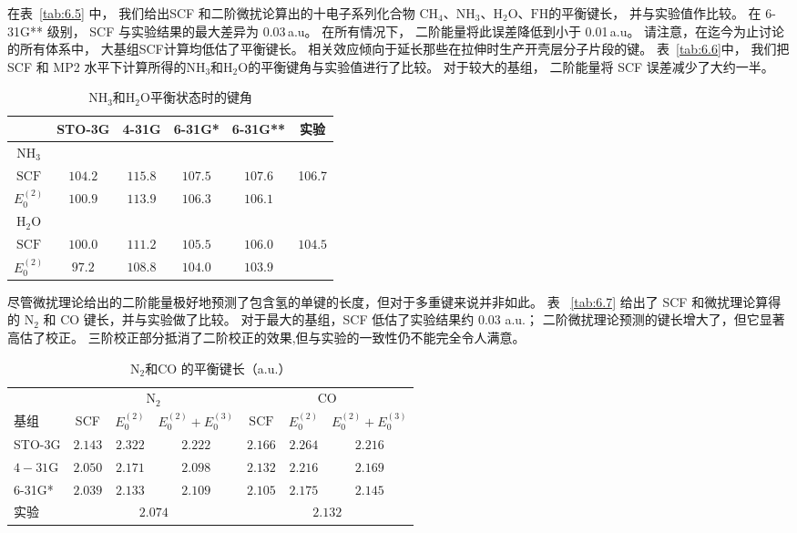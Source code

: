 在表~\autoref{tab:6.5} 中，
我们给出SCF 和二阶微扰论算出的十电子系列化合物
$\mathrm{CH}_4$、$\mathrm{NH}_3$、$\mathrm{H_2O}$、$\mathrm{FH}$的平衡键长，
并与实验值作比较。
在 6-31G** 级别，
SCF 与实验结果的最大差异为 0.03\,a.u。
在所有情况下，
二阶能量将此误差降低到小于 0.01\,a.u。
请注意，在迄今为止讨论的所有体系中，
大基组SCF计算均低估了平衡键长。
相关效应倾向于延长那些在拉伸时生产开壳层分子片段的键。 
表~\autoref{tab:6.6}中，
我们把SCF 和 MP2 水平下计算所得的$\mathrm{NH}_3$和$\mathrm{H_2O}$的平衡键角与实验值进行了比较。 
对于较大的基组，
二阶能量将 SCF 误差减少了大约一半。
\begin{table}
	\centering
	\caption{$\mathrm{NH_3}$和$\mathrm{H_2O}$平衡状态时的键角}
	\begin{threeparttable}
	\begin{tabular}{cccccc}
		\hline & STO-3G & 4-31G & 6-31G* & 6-31G** & 实验 \\
		\hline $\mathrm{NH}_3$ & & & & & \\
		$\mathrm{SCF}$ & $104.2$ & $115.8$ & $107.5$ & $107.6$ & \multirow{2}{*}{106.7} \\
		$E_0^{(2)}$ & $100.9$ & $113.9$ & $106.3$ & $106.1$ & \\
		$\mathrm{H}_2 \mathrm{O}$ & & & & & \\
		$\mathrm{SCF}$ & $100.0$ & $111.2$ & $105.5$ & $106.0$ & \multirow{2}{*}{$104.5$} \\
		$E_0^{(2)}$ & $97.2$ & $108.8$ & $104.0$ & $103.9$ & \\
		\hline
	\end{tabular}
	\end{threeparttable}
	\label{tab:6.6}
\end{table}

尽管微扰理论给出的二阶能量极好地预测了包含氢的单键的长度，但对于多重键来说并非如此。 表 ~\autoref{tab:6.7} 给出了 SCF 和微扰理论算得的 $\mathrm{N_2}$ 和 $\mathrm{CO}$ 键长，并与实验做了比较。 对于最大的基组，SCF 低估了实验结果约 0.03 a.u.； 二阶微扰理论预测的键长增大了，但它显著高估了校正。 三阶校正部分抵消了二阶校正的效果,但与实验的一致性仍不能完全令人满意。
\begin{table}\centering
	\caption{$\mathrm{N}_2$和$\mathrm{CO}$ 的平衡键长（a.u.）}
	\begin{tabular}{lcccccc}
		\hline 
		& \multicolumn{3}{c}{$\mathrm{N}_2$} &  \multicolumn{3}{c}{$\mathrm{CO}$} \\
		\cline { 2 - 4 } \cline { 5 - 7 } 基组 & SCF & $E_0^{(2)}$ & $E_0^{(2)}+E_0^{(3)}$ &  $\mathrm{SCF}$ & $E_0^{(2)}$ & $E_0^{(2)}+E_0^{(3)}$ \\
		\hline STO-3G & $2.143$ & $2.322$ & $2.222$ &  $2.166$ & $2.264$ & $2.216$ \\
		$4-31 \mathrm{G}$ & $2.050$ & $2.171$ & $2.098$  & $2.132$ & $2.216$ & $2.169$ \\
		6-31G* & $2.039$ & $2.133$ & $2.109$ &  $2.105$ & $2.175$ & $2.145$ \\
		实验 & \multicolumn{3}{c}{$2.074$}& \multicolumn{3}{c}{$2.132$}  \\
		\hline
	\end{tabular}
\label{tab:6.7}
\end{table}

